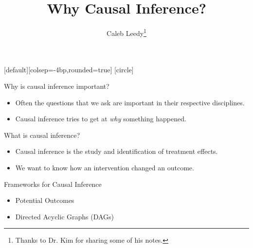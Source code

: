 \documentclass[handout]{beamer} %
\author[CL]{Caleb Leedy\footnote{Thanks to Dr. Kim for sharing some of his
notes.}}
\title[Background]{Why Causal Inference?}
\begin{document}
\everymath{\displaystyle}
[default][colsep=-4bp,rounded=true]
[circle]
\frame{\titlepage}

\begin{frame}{Why is causal inference important?}

\begin{itemize}
    \item Often the questions that we ask are important in their respective
      disciplines.
    \item Causal inference tries to get at \textit{why} something happened.
\end{itemize}

\end{frame}

\begin{frame}{What is causal inference?}

\begin{itemize}
    \item Causal inference is the study and identification of treatment effects.
    \item We want to know how an intervention changed an outcome.
\end{itemize}

\end{frame}

%
%
%
%
%
%
%
%

\begin{frame}{Frameworks for Causal Inference}

{

\begin{itemize}
    \item<1-2> Potential Outcomes
    \item<1> Directed Acyclic Graphs (DAGs)
\end{itemize}
}

\end{frame}
\end{document}
